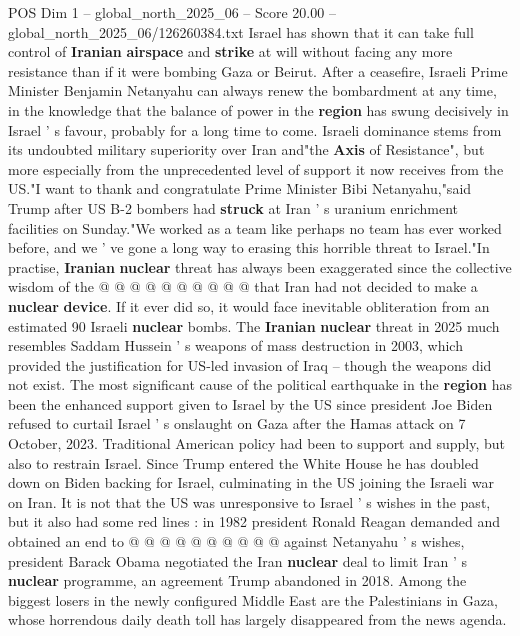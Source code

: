 \begin{textsample}{POS Dim 1 – global\_north\_2025\_06 – Score 20.00 – global\_north\_2025\_06/126260384.txt}  \label{ex:f1_pos_340}
Israel has shown that it can take full control of \textbf{Iranian} \textbf{airspace} and \textbf{strike} at will without facing any more resistance than if it were bombing Gaza or Beirut.
After a ceasefire, Israeli Prime Minister Benjamin Netanyahu can always renew the bombardment at any time, in the knowledge that the balance of power in the \textbf{region} has swung decisively in Israel ' s favour, probably for a long time to come.
Israeli dominance stems from its undoubted military superiority over Iran and"the \textbf{Axis} of Resistance", but more especially from the unprecedented level of support it now receives from the US."I want to thank and congratulate Prime Minister Bibi Netanyahu,"said Trump after US B-2 bombers had \textbf{struck} at Iran ' s uranium enrichment facilities on Sunday."We worked as a team like perhaps no team has ever worked before, and we ' ve gone a long way to erasing this horrible threat to Israel."In practise, \textbf{Iranian} \textbf{nuclear} threat has always been exaggerated since the collective wisdom of the @ @ @ @ @ @ @ @ @ @ that Iran had not decided to make a \textbf{nuclear} \textbf{device}.
If it ever did so, it would face inevitable obliteration from an estimated 90 Israeli \textbf{nuclear} bombs.
The \textbf{Iranian} \textbf{nuclear} threat in 2025 much resembles Saddam Hussein ' s weapons of mass destruction in 2003, which provided the justification for US-led invasion of Iraq -- though the weapons did not exist.
The most significant cause of the political earthquake in the \textbf{region} has been the enhanced support given to Israel by the US since president Joe Biden refused to curtail Israel ' s onslaught on Gaza after the Hamas attack on 7 October, 2023.
Traditional American policy had been to support and supply, but also to restrain Israel.
Since Trump entered the White House he has doubled down on Biden backing for Israel, culminating in the US joining the Israeli war on Iran.
It is not that the US was unresponsive to Israel ' s wishes in the past, but it also had some red lines : in 1982 president Ronald Reagan demanded and obtained an end to @ @ @ @ @ @ @ @ @ @ against Netanyahu ' s wishes, president Barack Obama negotiated the Iran \textbf{nuclear} deal to limit Iran ' s \textbf{nuclear} programme, an agreement Trump abandoned in 2018.
Among the biggest losers in the newly configured Middle East are the Palestinians in Gaza, whose horrendous daily death toll has largely disappeared from the news agenda.

\end{textsample}
